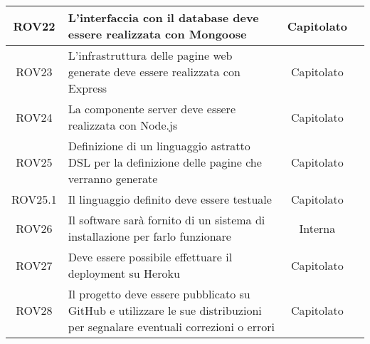 \begin{longtable}{|c|p{6cm}|c|c|}
\midrule
ROV22
& L'interfaccia  con il database deve essere realizzata con Mongoose
& Capitolato
& 
\\

\midrule
ROV23
& L'infrastruttura delle pagine web generate deve essere realizzata con Express
& Capitolato
& 
\\

\midrule
ROV24
& La componente server deve essere realizzata con Node.js
& Capitolato
& 
\\

\midrule
ROV25
& Definizione di un linguaggio astratto DSL per la definizione delle pagine che verranno generate
& Capitolato
& 
\\

\midrule
ROV25.1
& Il linguaggio definito deve essere testuale
& Capitolato
& 
\\

\midrule
ROV26
& Il software sarà fornito di un sistema di installazione per farlo funzionare
& Interna
& 
\\

\midrule
ROV27
& Deve essere possibile effettuare il deployment su Heroku 
& Capitolato
& 
\\

\midrule
ROV28
& Il progetto deve essere pubblicato su GitHub e utilizzare le sue distribuzioni per segnalare eventuali correzioni o errori
& Capitolato
& 
\\

\end{longtable}